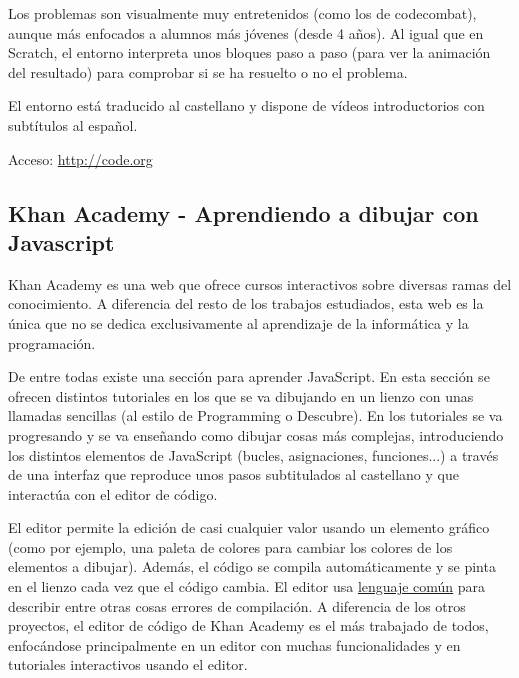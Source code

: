 \documentclass{report}
\begin{document}
	
	\vspace{10px}

	Los problemas son visualmente muy entretenidos (como los de codecombat), aunque más enfocados a alumnos más jóvenes (desde 4 años). Al igual que en Scratch, el entorno interpreta unos bloques paso a paso (para ver la animación del resultado) para comprobar si se ha resuelto o no el problema. 
	
	\vspace{10px}
	
	El entorno está traducido al castellano y dispone de vídeos introductorios con subtítulos al español.
	
	\vspace{10px}
	
	Acceso: \url{http://code.org}
	
	\subsection{Khan Academy - Aprendiendo a dibujar con Javascript}
	
	Khan Academy es una web que ofrece cursos interactivos sobre diversas ramas del conocimiento. A diferencia del resto de los trabajos estudiados, esta web es la única que no se dedica exclusivamente al aprendizaje de la informática y la programación.
	
	De entre todas existe una sección para aprender JavaScript. En esta sección se ofrecen distintos tutoriales en los que se va dibujando en un lienzo con unas llamadas sencillas (al estilo de Programming o Descubre). En los tutoriales se va progresando y se va enseñando como dibujar cosas más complejas, introduciendo los distintos elementos de JavaScript (bucles, asignaciones, funciones...) a través de una interfaz que reproduce unos pasos subtitulados al castellano y que interactúa con el editor de código.
		
	\vspace{10px}
	
	El editor permite la edición de casi cualquier valor usando un elemento gráfico (como por ejemplo, una paleta de colores para cambiar los colores de los elementos a dibujar). Además, el código se compila automáticamente y se pinta en el lienzo cada vez que el código cambia. El editor usa \hyperref[app:d]{lenguaje común} para describir entre otras cosas errores de compilación. A diferencia de los otros proyectos, el editor de código de Khan Academy es el más trabajado de todos, enfocándose principalmente en un editor con muchas funcionalidades y en tutoriales interactivos usando el editor.
	
\end{document}
